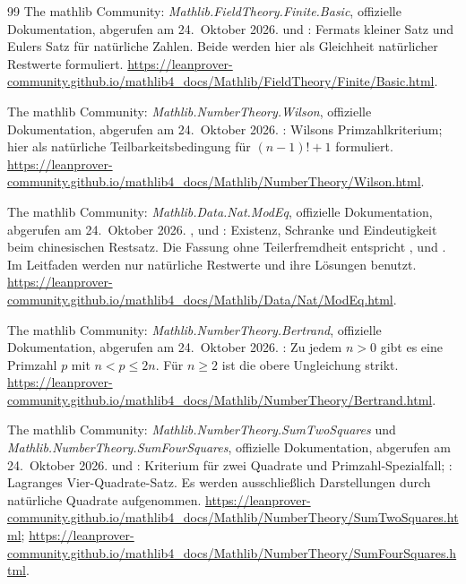\begin{thebibliography}{99}
The mathlib Community: \emph{Mathlib.FieldTheory.Finite.Basic},
offizielle Dokumentation, abgerufen am 24.~Oktober 2026.
 und
: Fermats kleiner Satz und Eulers Satz
für natürliche Zahlen. Beide werden hier als Gleichheit
natürlicher Restwerte formuliert.
\url{https://leanprover-community.github.io/mathlib4_docs/Mathlib/FieldTheory/Finite/Basic.html}.

The mathlib Community: \emph{Mathlib.NumberTheory.Wilson},
offizielle Dokumentation, abgerufen am 24.~Oktober 2026.
: Wilsons Primzahlkriterium;
hier als natürliche Teilbarkeitsbedingung für $(n-1)!+1$ formuliert.
\url{https://leanprover-community.github.io/mathlib4_docs/Mathlib/NumberTheory/Wilson.html}.

The mathlib Community: \emph{Mathlib.Data.Nat.ModEq},
offizielle Dokumentation, abgerufen am 24.~Oktober 2026.
, 
und :
Existenz, Schranke und Eindeutigkeit beim chinesischen Restsatz.
Die Fassung ohne Teilerfremdheit entspricht
, 
und .
Im Leitfaden werden nur natürliche Restwerte und ihre Lösungen benutzt.
\url{https://leanprover-community.github.io/mathlib4_docs/Mathlib/Data/Nat/ModEq.html}.

The mathlib Community: \emph{Mathlib.NumberTheory.Bertrand},
offizielle Dokumentation, abgerufen am 24.~Oktober 2026.
: Zu jedem $n>0$ gibt es
eine Primzahl $p$ mit $n<p\le2n$. Für $n\ge2$ ist die obere
Ungleichung strikt.
\url{https://leanprover-community.github.io/mathlib4_docs/Mathlib/NumberTheory/Bertrand.html}.

The mathlib Community: \emph{Mathlib.NumberTheory.SumTwoSquares}
und \emph{Mathlib.NumberTheory.SumFourSquares}, offizielle
Dokumentation, abgerufen am 24.~Oktober 2026.
 und :
Kriterium für zwei Quadrate und Primzahl-Spezialfall;
: Lagranges Vier-Quadrate-Satz.
Es werden ausschließlich Darstellungen durch natürliche Quadrate
aufgenommen.
\url{https://leanprover-community.github.io/mathlib4_docs/Mathlib/NumberTheory/SumTwoSquares.html};
\url{https://leanprover-community.github.io/mathlib4_docs/Mathlib/NumberTheory/SumFourSquares.html}.



\end{thebibliography}
